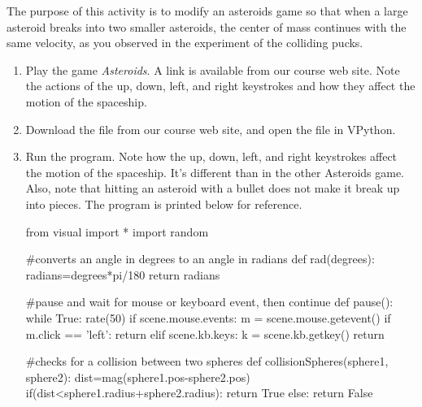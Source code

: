 
\apparatus
{}

\longgoal

The purpose of this activity is to modify an asteroids game so that when a large asteroid breaks into two smaller asteroids, the center of mass continues with the same velocity, as you observed in the experiment of the colliding pucks.

\procedure


\begin{enumerate}

\subsection*{Playing Asteroids}

\item Play the game \emph{Asteroids}.  A link is available from our course web site. Note the actions of the up, down, left, and right keystrokes and how they affect the motion of the spaceship.

\item Download the file  from our course web site, and open the file in VPython.

\item Run the program. Note how the up, down, left, and right keystrokes affect the motion of the spaceship. It's different than in the other Asteroids game. Also, note that hitting an asteroid with a bullet does not make it break up into pieces. The program is printed below for reference.

\begin{vpythonblock}
from visual import *
import random

#converts an angle in degrees to an angle in radians
def rad(degrees): 
    radians=degrees*pi/180
    return radians

#pause and wait for mouse or keyboard event, then continue
def pause():
    while True:
        rate(50)
        if scene.mouse.events:
            m = scene.mouse.getevent()
            if m.click == 'left': return
        elif scene.kb.keys:
            k = scene.kb.getkey()
            return

#checks for a collision between two spheres
def collisionSpheres(sphere1, sphere2):
    dist=mag(sphere1.pos-sphere2.pos)
    if(dist<sphere1.radius+sphere2.radius):
        return True
    else:
        return False


\end{vpythonblock}
\end{enumerate}
